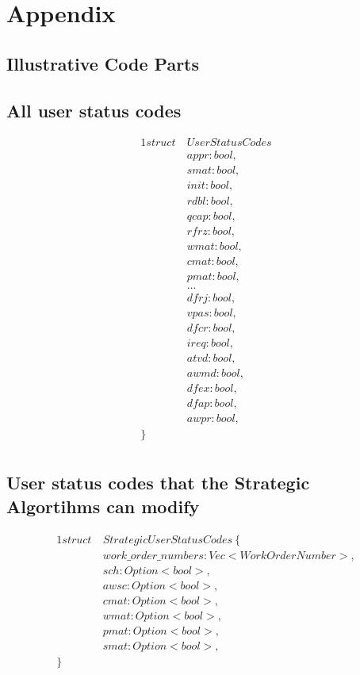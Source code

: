 \newpage
\section{Appendix}
\subsection{Illustrative Code Parts}\label{sec:separating-concerns}

\subsection{All user status codes}
\begin{alignat*}{1}
struct\ & UserStatusCodes \\
    & appr: bool, \\
    & smat: bool, \\
    & init: bool, \\
    & rdbl: bool, \\
    & qcap: bool, \\
    & rfrz: bool, \\
    & wmat: bool, \\
    & cmat: bool, \\
    & pmat: bool, \\
    & ... \\
    & dfrj: bool, \\
    & vpas: bool, \\
    & dfcr: bool, \\
    & ireq: bool, \\
    & atvd: bool, \\
    & awmd: bool, \\
    & dfex: bool, \\
    & dfap: bool, \\
    & awpr: bool, \\
\} \ \ &\\
\end{alignat*}

\subsection{User status codes that the Strategic Algortihms can modify}
\begin{alignat*}{1}
struct\ & StrategicUserStatusCodes \ \{ \\
    & work\_order\_numbers: Vec<WorkOrderNumber>,\\
    & sch: Option<bool>,\\
    & awsc: Option<bool>,\\
    & cmat: Option<bool>,\\
    & wmat: Option<bool>,\\
    & pmat: Option<bool>,\\
    & smat: Option<bool>,\\
\}\ \ &\\
\end{alignat*}
\newpage
